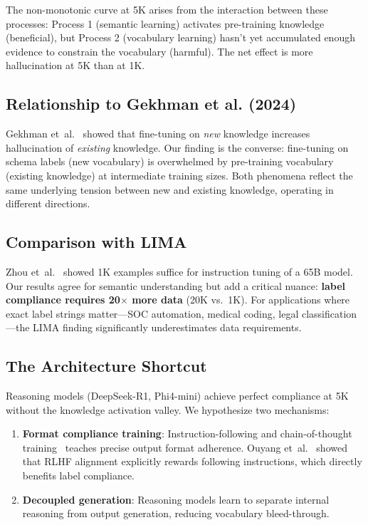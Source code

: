 \documentclass[review,3p]{elsarticle}
\begin{document}
The non-monotonic curve at 5K arises from the interaction between these processes: Process 1 (semantic learning) activates pre-training knowledge (beneficial), but Process 2 (vocabulary learning) hasn't yet accumulated enough evidence to constrain the vocabulary (harmful). The net effect is more hallucination at 5K than at 1K.

\subsection{Relationship to Gekhman et al. (2024)}
Gekhman et~al.~\cite{gekhman2024} showed that fine-tuning on \emph{new} knowledge increases hallucination of \emph{existing} knowledge. Our finding is the converse: fine-tuning on schema labels (new vocabulary) is overwhelmed by pre-training vocabulary (existing knowledge) at intermediate training sizes. Both phenomena reflect the same underlying tension between new and existing knowledge, operating in different directions.

\subsection{Comparison with LIMA}
Zhou et~al.~\cite{zhou2023} showed 1K examples suffice for instruction tuning of a 65B model. Our results agree for semantic understanding but add a critical nuance: \textbf{label compliance requires 20$\times$ more data} (20K vs.\ 1K). For applications where exact label strings matter---SOC automation, medical coding, legal classification---the LIMA finding significantly underestimates data requirements.

\subsection{The Architecture Shortcut}
Reasoning models (DeepSeek-R1, Phi4-mini) achieve perfect compliance at 5K without the knowledge activation valley. We hypothesize two mechanisms:
\begin{enumerate}
\item \textbf{Format compliance training}: Instruction-following and chain-of-thought training~\cite{wei2022} teaches precise output format adherence. Ouyang et~al.~\cite{ouyang2022} showed that RLHF alignment explicitly rewards following instructions, which directly benefits label compliance.
\item \textbf{Decoupled generation}: Reasoning models learn to separate internal reasoning from output generation, reducing vocabulary bleed-through.
\end{enumerate}
\end{document}
